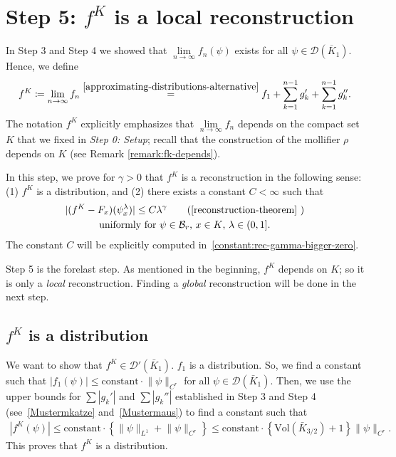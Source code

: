 \section{Step 5: \texorpdfstring{\(f^K\) is a local reconstruction}{fK satisfies the reconstruction theorem}}

In Step 3 and Step 4 we showed that \(\lim\limits_{n \to \infty}f_n(\psi)\) exists for all \(\psi \in \mathcal{D}(\overline{K}_1)\). Hence, we define
\begin{align*}
    f^K \coloneqq \lim\limits_{n \to \infty}f_n \overset{\eqref{approximating-distributions-alternative}}{=} f_1 + \sum^{n-1}_{k=1} g_k' + \sum^{n-1}_{k=1} g_k''.
\end{align*}
The notation \(f^K\) explicitly emphasizes that \(\lim\limits_{n \to \infty}f_n\) depends on the compact set \(K\) that we fixed in \emph{Step 0: Setup}; recall that the construction of the mollifier \(\rho\)  depends on \(K\) (see Remark \ref{remark:fk-depends}).
 
In this step, we prove for \(\gamma > 0\) that \(f^K\) is a reconstruction in the following sense: (1) \(f^K\) is a distribution, and (2) there exists a constant \(C < \infty\) such that 
\begin{gather*}
    |(f^K - F_x)(\psi^\lambda_x)| \leq C \lambda^\gamma \tag{\ref{reconstruction-theorem}
    }\\ 
    \text{uniformly for \(\psi \in \mathcal{B}_r\), \(x \in K\), \(\lambda \in (0,1]\)}.
\end{gather*}
The constant \(C\) will be explicitly computed in~\eqref{constant:rec-gamma-bigger-zero}. 

Step 5 is the forelast step. As mentioned in the beginning, \(f^K\) depends on \(K\); so it is only a \emph{local} reconstruction. Finding a \emph{global} reconstruction will be done in the next step.

\subsection*{\(f^K\) is a distribution} 

We want to show that \(f^K \in \mathcal{D}'(\bar K_1)\). \(f_1\) is a distribution. So, we find a constant such that \(|f_1(\psi)| \leq \mathrm{constant} \cdot \lVert \psi \rVert_{C^r}\) for all \(\psi \in \mathcal{D}(\bar K_1)\). Then, we use the upper bounds for \(\sum |g_k'|\) and \(\sum |g_k''|\) established in Step 3 and Step 4 (see~\eqref{Mustermkatze} and~\eqref{Mustermaus}) to find a constant such that  
\begin{align*}
    |f^K(\psi)| \leq \mathrm{constant} \cdot \left\{ \lVert \psi\rVert_{L^1} + \lVert \psi\rVert_{C^r} \right\} \leq  \mathrm{constant} \cdot \left\{  \mathrm{Vol}(\bar K_{3/2}) + 1 \right\} \lVert \psi \rVert_{C^r}.
\end{align*}
This proves that \(f^K\) is a distribution. 


